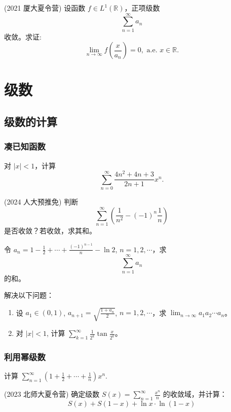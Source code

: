 \documentclass[lang=cn,10pt,thmcnt=section]{elegantbook}
\begin{document}
\begin{example}
	(2021 厦大夏令营) 设函数 \( f \in L^1(\mathbb{R}) \)，正项级数 
\[
\sum_{n=1}^\infty a_n
\] 
收敛。求证: 
\[
\lim_{n \to \infty} f\left(\frac{x}{a_n}\right) = 0, \text{ a.e. } x \in \mathbb{R}.
\]
\end{example}
\chapter{级数}
\section{级数的计算}
\subsection{凑已知函数}
\begin{example}
	对 $|x| < 1$，计算
\[
\sum_{n=0}^{\infty} \frac{4n^2 + 4n + 3}{2n+1}x^n.
\]
\end{example}
\begin{example}
	(2024 人大预推免) 判断
\[
\sum_{n=1}^{\infty} \left( \frac{1}{n^2} - (-1)^n \frac{1}{n} \right)
\]
是否收敛？若收敛，求其和。
\end{example}
\begin{example}
	令 $a_n = 1 - \frac{1}{2} + \cdots + \frac{(-1)^{n-1}}{n} - \ln 2$, $n = 1, 2, \cdots$，求
\[
\sum_{n=1}^{\infty} a_n
\]
的和。
\end{example}
\begin{example}
	解决以下问题：
\begin{enumerate}
    \item 设 $a_1 \in (0, 1)$, $a_{n+1} = \sqrt{\frac{1 + a_n}{2}}$, $n = 1, 2, \cdots$，求 $\lim_{n \to \infty} a_1 a_2 \cdots a_n$。
    \item 对 $|x| < 1$, 计算 $\sum_{k=1}^{\infty} \frac{1}{2^k} \tan \frac{x}{2^k}$。
\end{enumerate}
\end{example}
\subsection{利用幂级数}
\begin{example}
	计算 $\sum_{n=1}^{\infty} \left(1 + \frac{1}{2} + \cdots + \frac{1}{n}\right) x^n$.
	\end{example}
	
	\begin{example}
	(2023 北师大夏令营) 确定级数 $S(x) = \sum_{n=1}^{\infty} \frac{x^n}{n}$ 的收敛域，并计算：
	\[
	S(x) + S(1-x) + \ln x \cdot \ln(1-x)
	\]
	\end{example}
	
\end{document}
